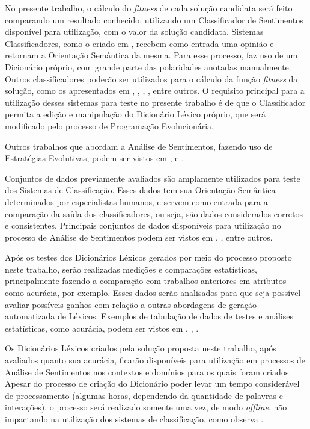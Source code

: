 \documentclass[a4paper,11pt]{article}
\begin{document}
No presente trabalho, o cálculo do \emph{fitness} de cada solução candidata será feito comparando um resultado conhecido, utilizando um Classificador de Sentimentos disponível para utilização, com o valor da solução candidata. Sistemas Classificadores, como o criado em \cite{Rodrigues2016}, recebem como entrada uma opinião e retornam a Orientação Semântica da mesma. Para esse processo, \cite{Rodrigues2016} faz uso de um Dicionário próprio, com grande parte das polaridades anotadas manualmente. Outros classificadores poderão ser utilizados para o cálculo da função \emph{fitness} da solução, como os apresentados em \cite{Pang2002}, \cite{Zhou2014}, \cite{silva2010automatic}, \cite{kdir16}, entre outros. O requisito principal para a utilização desses sistemas para teste no presente trabalho é de que o Classificador permita a edição e manipulação do Dicionário Léxico próprio, que será modificado pelo processo de Programação Evolucionária.

Outros trabalhos que abordam a Análise de Sentimentos, fazendo uso de Estratégias Evolutivas, podem ser vistos em \cite{ferreira2015using}, \cite{vohra2013comparative} e \cite{HADDI2013}.

Conjuntos de dados previamente avaliados são amplamente utilizados para teste dos Sistemas de Classificação. Esses dados tem sua Orientação Semântica determinados por especialistas humanos, e servem como entrada para a comparação da saída dos classificadores, ou seja, são dados considerados corretos e consistentes. Principais conjuntos de dados disponíveis para utilização no processo de Análise de Sentimentos podem ser vistos em \cite{Iqbal}, \cite{taboada2011lexicon}, entre outros. 

Após os testes dos Dicionários Léxicos gerados por meio do processo proposto neste trabalho, serão realizadas medições e comparações estatísticas, principalmente fazendo a comparação com trabalhos anteriores em atributos como acurácia, por exemplo. Esses dados serão analisados para que seja possível avaliar possíveis ganhos com relação a outras abordagens de geração automatizada de Léxicos. Exemplos de tabulação de dados de testes e análises estatísticas, como acurácia, podem ser vistos em \cite{taboada2011lexicon}, \cite{Kanayama2006}, \cite{HADDI2013}.

Os Dicionários Léxicos criados pela solução proposta neste trabalho, após avaliados quanto sua acurácia, ficarão disponíveis para utilização em processos de Análise de Sentimentos nos contextos e domínios para os quais foram criados. Apesar do processo de criação do Dicionário poder levar um tempo considerável de processamento (algumas horas, dependendo da quantidade de palavras e interações), o processo será realizado somente uma vez, de modo \emph{offline}, não impactando na utilização dos sistemas de classificação, como observa \cite{Abbasi}.
\end{document}
